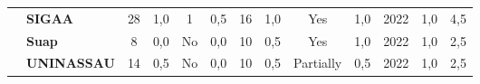 \begin{table}[!htb]
\begin{tabular}{c|p{2cm}|cc|cc|cc|cc|cc|c}
    \rowcolor[rgb]{0.898,0.898,0.898} {\cellcolor[rgb]{0.753,0.753,0.753}}          & {\cellcolor[rgb]{0.753,0.753,0.753}}\textbf{SIGAA}                                                 & 28                                                                        & 1,0                                                                       & 1                                                                         & 0,5                                                                      & 16                                                       & 1,0                                               & Yes                                                & 1,0                                               & 2022                                               & 1,0                                                                                                                                                 & 4,5 \\
    {\cellcolor[rgb]{0.753,0.753,0.753}}                                            & {\cellcolor[rgb]{0.753,0.753,0.753}}\textbf{Suap}                                                  & 8                                                                         & 0,0                                                                       & No                                                                        & 0,0                                                                      & 10                                                       & 0,5                                               & Yes                                                & 1,0                                               & 2022                                               & 1,0                                                                                                                                                 & 2,5 \\
    \rowcolor[rgb]{0.898,0.898,0.898} {\cellcolor[rgb]{0.753,0.753,0.753}}          & {\cellcolor[rgb]{0.753,0.753,0.753}}\textbf{UNINASSAU}                                             & 14                                                                        & 0,5                                                                       & No                                                                        & 0,0                                                                      & 10                                                       & 0,5                                               & Partially                                          & 0,5                                               & 2022                                               & 1,0                                                                                                                                                 & 2,5 \\

\end{tabular}
\end{table}
